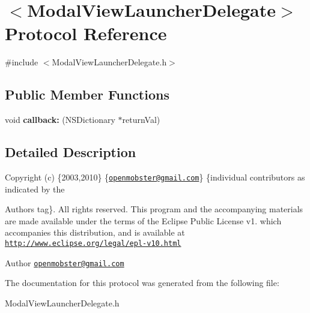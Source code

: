 \hypertarget{protocol_modal_view_launcher_delegate-p}{
\section{$<$\-Modal\-View\-Launcher\-Delegate$>$ \-Protocol \-Reference}
\label{protocol_modal_view_launcher_delegate-p}
}


{\ttfamily \#include $<$\-Modal\-View\-Launcher\-Delegate.\-h$>$}

\subsection*{\-Public \-Member \-Functions}
\begin{DoxyCompactItemize}
\item 
\hypertarget{protocol_modal_view_launcher_delegate-p_ac547c4fd2fe4c22f4b5fc0fff92c14c1}{
void {\bfseries callback\-:} (\-N\-S\-Dictionary $\ast$return\-Val)}
\label{protocol_modal_view_launcher_delegate-p_ac547c4fd2fe4c22f4b5fc0fff92c14c1}

\end{DoxyCompactItemize}


\subsection{\-Detailed \-Description}
\-Copyright (c) \{2003,2010\} \{\href{mailto:openmobster@gmail.com}{\tt openmobster@gmail.\-com}\} \{individual contributors as indicated by the \begin{DoxyAuthor}{\-Authors}
tag\}. \-All rights reserved. \-This program and the accompanying materials are made available under the terms of the \-Eclipse \-Public \-License v1. which accompanies this distribution, and is available at \href{http://www.eclipse.org/legal/epl-v10.html}{\tt http\-://www.\-eclipse.\-org/legal/epl-\/v10.\-html}
\end{DoxyAuthor}
\begin{DoxyAuthor}{\-Author}
\href{mailto:openmobster@gmail.com}{\tt openmobster@gmail.\-com} 
\end{DoxyAuthor}


\-The documentation for this protocol was generated from the following file\-:\begin{DoxyCompactItemize}
\item 
\-Modal\-View\-Launcher\-Delegate.\-h\end{DoxyCompactItemize}
